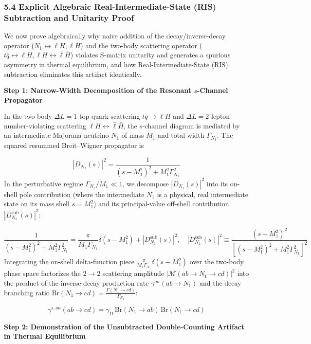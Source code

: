 \documentclass[aps,prd,onecolumn,superscriptaddress,nofootinbib,longbibliography,10pt]{revtex4-2}
\begin{document}
{{  
\subsubsection*{5.4 Explicit Algebraic Real-Intermediate-State (RIS) Subtraction and Unitarity Proof}

  We now prove algebraically why naive addition of the decay/inverse-decay operator (\(N_1 \leftrightarrow \ell H, \bar{\ell}\bar{H}\)) and the two-body scattering operator (\(t\bar{q} \leftrightarrow \ell H, \ell H \leftrightarrow \bar{\ell}\bar{H}\)) violates S-matrix unitarity and generates a spurious asymmetry in thermal equilibrium, and how Real-Intermediate-State (RIS) subtraction eliminates this artifact identically.


  \textbf{Step 1: Narrow-Width Decomposition of the Resonant \(s\)-Channel Propagator}


  In the two-body \(\Delta L = 1\) top-quark scattering \(t\bar{q} \to \ell H\) and \(\Delta L = 2\) lepton-number-violating scattering \(\ell H \leftrightarrow \bar{\ell}\bar{H}\), the \(s\)-channel diagram is mediated by an intermediate Majorana neutrino \(N_1\) of mass \(M_1\) and total width \(\Gamma_{N_1}\). The squared resummed Breit–Wigner propagator is


  \[ |D_{N_1}(s)|^2 = \frac{1}{(s - M_1^2)^2 + M_1^2\Gamma_{N_1}^2} \]
  In the perturbative regime \(\Gamma_{N_1}/M_1 \ll 1\), we decompose \(|D_{N_1}(s)|^2\) into its on-shell pole contribution (where the intermediate \(N_1\) is a physical, real intermediate state on its mass shell \(s = M_1^2\)) and its principal-value off-shell contribution \(|D_{N_1}^{\text{sub}}(s)|^2\):


  \[ \frac{1}{(s - M_1^2)^2 + M_1^2\Gamma_{N_1}^2} = \frac{\pi}{M_1\Gamma_{N_1}}\delta(s - M_1^2) + |D_{N_1}^{\text{sub}}(s)|^2, \quad |D_{N_1}^{\text{sub}}(s)|^2 \equiv \frac{(s - M_1^2)^2}{\left[(s - M_1^2)^2 + M_1^2\Gamma_{N_1}^2\right]^2} \]
  Integrating the on-shell delta-function piece \(\frac{\pi}{M_1\Gamma_{N_1}}\delta(s - M_1^2)\) over the two-body phase space factorizes the \(2 \to 2\) scattering amplitude \(|\mathcal{M}(ab \to N_1 \to cd)|^2\) into the product of the inverse-decay production rate \(\gamma^{on}(ab \to N_1)\) and the decay branching ratio \(\text{Br}(N_1 \to cd) = \frac{\Gamma(N_1\to cd)}{\Gamma_{N_1}}\):


  \[ \gamma^{s,on}(ab \to cd) = \gamma_D\,\text{Br}(N_1 \to ab)\,\text{Br}(N_1 \to cd) \]

  \textbf{Step 2: Demonstration of the Unsubtracted Double-Counting Artifact in Thermal Equilibrium}


}}
\end{document}
